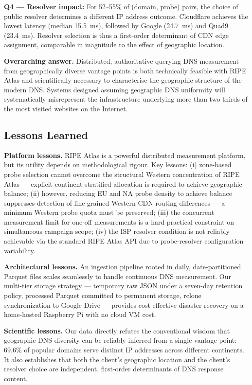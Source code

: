 \textbf{Q4 --- Resolver impact:} For 52--55\% of (domain, probe) pairs, the choice of public resolver determines a different \ac{IP} address outcome. Cloudflare achieves the lowest latency (median 15.5~ms), followed by Google (24.7~ms) and Quad9 (23.4~ms). Resolver selection is thus a first-order determinant of \ac{CDN} edge assignment, comparable in magnitude to the effect of geographic location.

\textbf{Overarching answer.} Distributed, authoritative-querying \ac{DNS} measurement from geographically diverse vantage points is both technically feasible with RIPE Atlas and scientifically necessary to characterise the geographic structure of the modern \ac{DNS}. Systems designed assuming geographic \ac{DNS} uniformity will systematically misrepresent the infrastructure underlying more than two thirds of the most visited websites on the Internet.

\bigskip
\subsection{Lessons Learned}
\label{subsec:5.5.3}

\textbf{Platform lessons.} RIPE Atlas is a powerful distributed measurement platform, but its utility depends on methodological rigour. Key lessons: (i) zone-based probe selection cannot overcome the structural Western concentration of RIPE Atlas --- explicit continent-stratified allocation is required to achieve geographic balance; (ii) however, reducing EU and NA probe density to achieve balance suppresses detection of fine-grained Western \ac{CDN} routing differences --- a minimum Western probe quota must be preserved; (iii) the concurrent measurement limit for one-off measurements is a hard practical constraint on simultaneous campaign scope; (iv) the \ac{ISP} resolver condition is not reliably achievable via the standard RIPE Atlas \ac{API} due to probe-resolver configuration variability.

\textbf{Architectural lessons.} An ingestion pipeline rooted in daily, date-partitioned Parquet files scales seamlessly to handle continuous \ac{DNS} measurement. Our multi-tier storage strategy --- temporary raw JSON under a seven-day retention policy, processed Parquet committed to permanent storage, rclone synchronization to Google Drive --- provides cost-effective disaster recovery on a home-hosted Raspberry Pi with no cloud VM cost.

\textbf{Scientific lessons.} Our data directly refutes the conventional wisdom that geographic \ac{DNS} diversity can be reliably inferred from a single vantage point: 69.6\% of popular domains serve distinct \ac{IP} addresses across different continents. It also establishes that both the client's geographic location and the client's resolver choice are independent, first-order determinants of \ac{DNS} response content.

